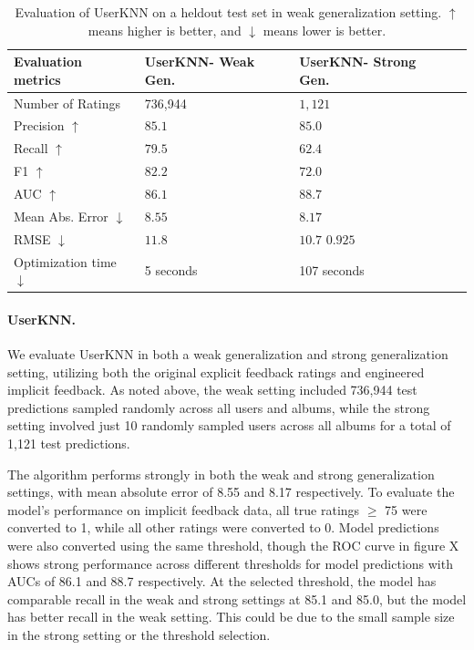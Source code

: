 \documentclass{article}
\newcommand{\userknn}{UserKNN\xspace}
\begin{document}
\begin{table}[h]
\centering
\begin{tabular}{@{}llll@{}}
\toprule
Evaluation metrics    & \userknn - Weak Gen. & \userknn -
Strong Gen.
\\ \midrule
Number of Ratings			  & 736,944
&$1,121$ \\
Precision $\uparrow$	      & $85.1$		     & $85.0$
\\
Recall	$\uparrow$		& $79.5$	       & $62.4$
\\
F1	$\uparrow$		    & $82.2$		   &
$72.0$
\\
AUC $\uparrow$					& $86.1$
& $88.7$
\\
Mean Abs.
Error $\downarrow$	   & $8.55$		& $8.17$ \\ RMSE $\downarrow$
	   & $11.8$		&$10.7$ $0.925$ \\ Optimization time
 $\downarrow$ & 5 seconds & 107 seconds \\ \bottomrule \end{tabular}
 \caption{Evaluation of \userknn on a heldout test set in weak generalization
 setting.
$\uparrow$ means
higher is better, and $\downarrow$
means lower is better.}
\label{tab:userknn-results}

\end{table}

\paragraph*{\userknn.}
We evaluate \userknn in both a weak generalization and strong generalization
 setting, utilizing both the original explicit feedback ratings and engineered
 implicit feedback.
As noted above, the weak setting included 736,944 test predictions sampled
 randomly across all users and albums, while the strong setting involved just 10
 randomly sampled users across all albums for a total of 1,121 test predictions.

The algorithm performs strongly in both the weak and strong generalization
 settings, with mean absolute error of 8.55 and 8.17 respectively.
To evaluate the model's performance on implicit feedback data, all true ratings
 $\geq$ 75 were converted to 1, while all other ratings were converted to 0.
Model predictions were also converted using the same threshold, though the ROC
 curve in figure X shows strong performance across different thresholds for
 model predictions with AUCs of 86.1 and 88.7 respectively.
At the selected threshold, the model has comparable recall in the weak and
 strong settings at 85.1 and 85.0, but the model has better recall in the weak
 setting.
This could be due to the small sample size in the strong setting or the
 threshold selection.

\newpage


\end{document}
